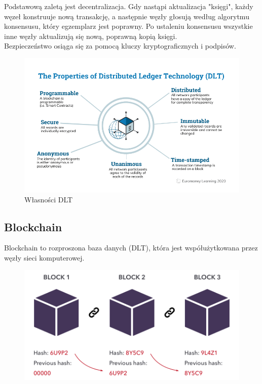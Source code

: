 \documentclass[12pt]{article}
\newenvironment{centerfig}
{\begin{figure}[H]\centering}
{\end{figure}}
\begin{document}
Podstawową zaletą jest decentralizacja. Gdy nastąpi aktualizacja "księgi", każdy węzeł konstruuje nową transakcję, a następnie węzły głosują według algorytmu konsensusu, który egzemplarz jest poprawny. Po ustaleniu konsensusu wszystkie inne węzły aktualizują się nową, poprawną kopią księgi.\\
Bezpieczeństwo osiąga się za pomocą kluczy kryptograficznych i podpisów.

\begin{centerfig}
  \includegraphics[width=\textwidth]{2.png}
  \caption{Własności DLT\cite{2png}}
\end{centerfig}

\subsection{Blockchain}

Blockchain to rozproszona baza danych (DLT), która jest współużytkowana przez węzły sieci komputerowej.

\begin{centerfig}
  \includegraphics[width=\textwidth]{3.png}
\end{centerfig}
\end{document}
